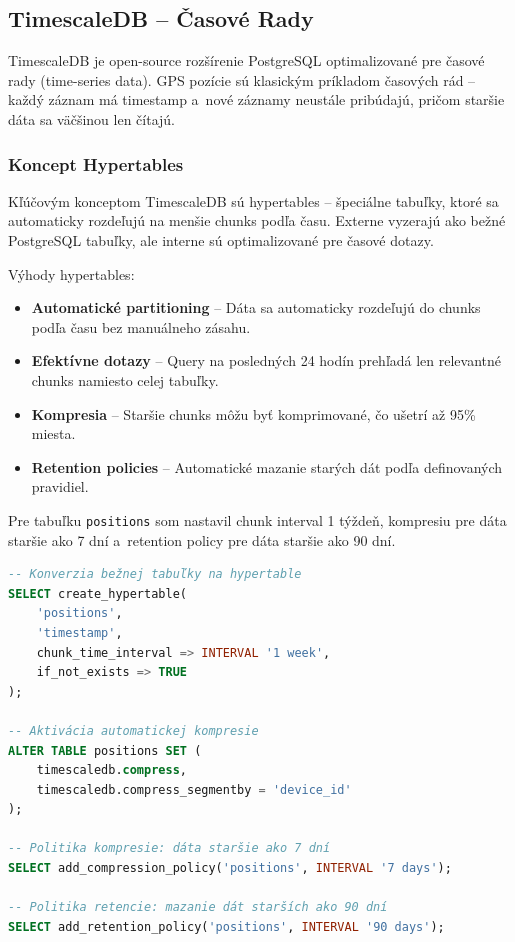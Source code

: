 \subsection{TimescaleDB -- Časové Rady}
\label{sec:TimescaleDB}

TimescaleDB je open-source rozšírenie PostgreSQL optimalizované pre časové rady (time-series data). GPS pozície sú klasickým príkladom časových rád -- každý záznam má timestamp a~nové záznamy neustále pribúdajú, pričom staršie dáta sa väčšinou len čítajú.

\subsubsection{Koncept Hypertables}

Kľúčovým konceptom TimescaleDB sú hypertables -- špeciálne tabuľky, ktoré sa automaticky rozdeľujú na menšie chunks podľa času. Externe vyzerajú ako bežné PostgreSQL tabuľky, ale interne sú optimalizované pre časové dotazy.

Výhody hypertables:

\begin{itemize}
    \item \textbf{Automatické partitioning} -- Dáta sa automaticky rozdeľujú do chunks podľa času bez manuálneho zásahu.

    \item \textbf{Efektívne dotazy} -- Query na posledných 24 hodín prehľadá len relevantné chunks namiesto celej tabuľky.

    \item \textbf{Kompresia} -- Staršie chunks môžu byť komprimované, čo ušetrí až 95\% miesta.

    \item \textbf{Retention policies} -- Automatické mazanie starých dát podľa definovaných pravidiel.
\end{itemize}

Pre tabuľku \texttt{positions} som nastavil chunk interval 1 týždeň, kompresiu pre dáta staršie ako 7 dní a~retention policy pre dáta staršie ako 90 dní.

\begin{lstlisting}[language=SQL, label=src:hypertable, caption={Vytvorenie TimescaleDB hypertable s~kompresiou}]
-- Konverzia bežnej tabuľky na hypertable
SELECT create_hypertable(
    'positions',
    'timestamp',
    chunk_time_interval => INTERVAL '1 week',
    if_not_exists => TRUE
);

-- Aktivácia automatickej kompresie
ALTER TABLE positions SET (
    timescaledb.compress,
    timescaledb.compress_segmentby = 'device_id'
);

-- Politika kompresie: dáta staršie ako 7 dní
SELECT add_compression_policy('positions', INTERVAL '7 days');

-- Politika retencie: mazanie dát starších ako 90 dní
SELECT add_retention_policy('positions', INTERVAL '90 days');
\end{lstlisting}

